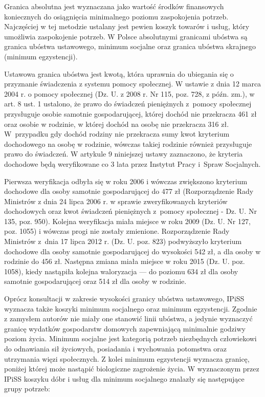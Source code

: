 Granica absolutna jest wyznaczana jako wartość środków finansowych koniecznych do osiągnięcia minimalnego poziomu zaspokojenia potrzeb. Najczęściej w tej metodzie ustalany jest pewien koszyk towarów i usług, który umożliwia zaspokojenie potrzeb. W Polsce absolutnymi granicami ubóstwa są granica ubóstwa ustawowego, minimum socjalne oraz granica ubóstwa skrajnego (minimum egzystencji).

Ustawowa granica ubóstwa jest kwotą, która uprawnia do ubiegania się o przyznanie świadczenia z systemu pomocy społecznej. W ustawie z dnia 12 marca 2004 r. o pomocy społecznej (Dz. U. z 2008 r. Nr 115, poz. 728, z późn. zm.), w art. 8 ust. 1 ustalono, że prawo do świadczeń pieniężnych z~pomocy społecznej przysługuje osobie samotnie gospodarującej, której dochód nie przekracza 461 zł oraz osobie w rodzinie, w której dochód na osobę nie przekracza 316 zł. W~przypadku gdy dochód rodziny nie przekracza sumy kwot kryterium dochodowego na osobę w rodzinie, wówczas takiej rodzinie również przysługuje prawo do świadczeń. W artykule 9 niniejszej ustawy zaznaczono, że kryteria dochodowe będą weryfikowane co 3 lata przez Instytut Pracy i~Spraw Socjalnych.

Pierwsza weryfikacja odbyła się w roku 2006 i wówczas zwiększono kryterium dochodowe dla osoby samotnie gospodarującej do 477 zł (Rozporządzenie Rady Ministrów z dnia 24 lipca 2006 r. w sprawie zweryfikowanych kryteriów dochodowych oraz kwot świadczeń pieniężnych z~pomocy społecznej - Dz. U. Nr 135, poz. 950). Kolejna weryfikacja miała miejsce w roku 2009 (Dz. U. Nr 127, poz. 1055) i wówczas progi nie zostały zmienione. Rozporządzenie Rady Ministrów z~dnia 17 lipca 2012 r. (Dz. U. poz. 823) podwyższyło kryterium dochodowe dla osoby samotnie gospodarującej do wysokości 542 zł, a dla osoby w rodzinie do 456 zł. Następna zmiana miała miejsce w roku 2015 (Dz. U. poz. 1058), kiedy nastąpiła kolejna waloryzacja --- do poziomu 634 zł dla osoby samotnie gospodarującej oraz 514 zł dla osoby w rodzinie.

Oprócz konsultacji w zakresie wysokości granicy ubóstwa ustawowego, IPiSS wyznacza także koszyki minimum socjalnego oraz minimum egzystencji. Zgodnie z zamysłem autorów nie miały one stanowić linii ubóstwa, a jedynie wyznaczyć granicę wydatków gospodarstw domowych zapewniającą minimalnie godziwy poziom życia. Minimum socjalne jest kategorią potrzeb niezbędnych człowiekowi do odnawiania sił życiowych, posiadania i wychowania potomstwa oraz utrzymania więzi społecznych. Z kolei minimum egzystencji wyznacza granicę, poniżej której może nastąpić biologiczne zagrożenie życia. W wyznaczonym przez IPiSS koszyku dóbr i usług dla minimum socjalnego znalazły się następujące grupy potrzeb:

